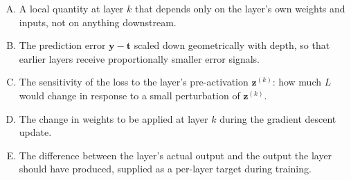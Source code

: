 \documentclass[12pt]{amsart}
\begin{document}
\begin{enumerate}[(A)]
\item A local quantity at layer $k$ that depends only on the layer's own weights and inputs, not on anything downstream.
\item The prediction error $\mathbf{y} - \mathbf{t}$ scaled down geometrically with depth, so that earlier layers receive proportionally smaller error signals.
\item The sensitivity of the loss to the layer's pre-activation $\mathbf{z}^{(k)}$: how much $L$ would change in response to a small perturbation of $\mathbf{z}^{(k)}$.
\item The change in weights to be applied at layer $k$ during the gradient descent update.
\item The difference between the layer's actual output and the output the layer should have produced, supplied as a per-layer target during training.
\end{enumerate}
\end{document}

